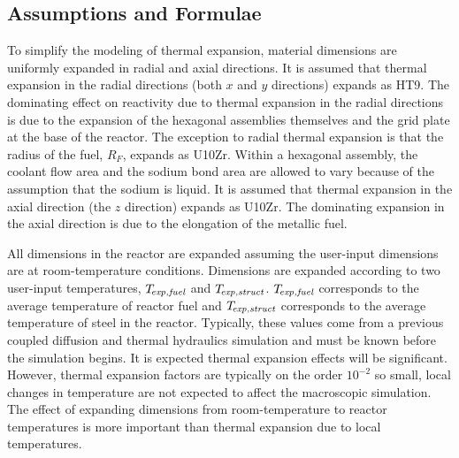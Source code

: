   \subsection{Assumptions and Formulae}
  \label{sec:model_details__assumptions_and_formulae}
    To simplify the modeling of thermal expansion, material dimensions are
    uniformly expanded in radial and axial directions. It is assumed that 
    thermal expansion in the radial directions (both $x$ and $y$ directions) 
    expands as HT9. The dominating effect on reactivity due to thermal 
    expansion in the radial directions is due to the expansion of the hexagonal 
    assemblies themselves and the grid plate at the base of the reactor. The 
    exception to radial thermal expansion is that the radius of the fuel, 
    $R_F$, expands as U10Zr. Within a hexagonal assembly, the coolant flow area 
    and the sodium bond area are allowed to vary because of the assumption that 
    the sodium is liquid. It is assumed that thermal expansion in the axial 
    direction (the $z$ direction) expands as U10Zr. The dominating expansion 
    in the axial direction is due to the elongation of the metallic fuel.
    
    All dimensions in the reactor are expanded assuming the user-input
    dimensions are at room-temperature conditions. Dimensions are expanded
    according to two user-input temperatures, ${T_{\!\mbox{\scriptsize \em exp,fuel}}}$ and $T_{\!\mbox{\scriptsize \em exp,struct}}$.
    ${T_{\!\mbox{\scriptsize \em exp,fuel}}}$ corresponds to the average temperature of reactor fuel and
    $T_{\!\mbox{\scriptsize \em exp,struct}}$ corresponds to the average temperature of steel in the
    reactor. Typically, these values come from a previous coupled diffusion and
    thermal hydraulics simulation and must be known before the simulation
    begins. It is expected thermal expansion effects will be significant.
    However, thermal expansion factors are typically on the order $10^{-2}$ so
    small, local changes in temperature are not expected to affect the
    macroscopic simulation. The effect of expanding dimensions from
    room-temperature to reactor temperatures is more important than thermal
    expansion due to local temperatures.


